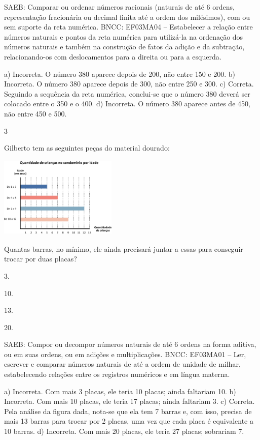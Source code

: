 \begin{multicols}{2}
\begin{enumerate}
{SAEB: Comparar ou ordenar números racionais (naturais de até 6 ordens, representação fracionária ou decimal finita até a ordem dos milésimos), com ou sem suporte da reta numérica.
BNCC: EF03MA04 -- Estabelecer a relação entre números naturais e pontos da reta numérica para
utilizá-la na ordenação dos números naturais e também na construção de fatos da adição e da
subtração, relacionando-os com deslocamentos para a direita ou para a esquerda.

a) Incorreta. O número 380 aparece depois de 200, não entre 150 e 200.
b) Incorreta. O número 380 aparece depois de 300, não entre 250 e 300.
c) Correta. Seguindo a sequência da reta numérica, conclui-se que o número 380 deverá ser colocado entre o 350 e o 400.
d) Incorreta. O número 380 aparece antes de 450, não entre 450 e 500.

\num{3}

Gilberto tem as seguintes peças do material dourado:


\includegraphics[width=2.20852in,height=1.52513in]{media/image118.png}

Quantas barras, no mínimo, ele ainda precisará juntar a essas para conseguir trocar por duas placas?

\begin{escolha}
\item
  3.
\item
  10.
\item
  13.
\item
  20.
\end{escolha}

SAEB: Compor ou decompor números naturais de até 6 ordens na forma aditiva, ou em suas ordens, ou em adições e multiplicações.
BNCC: EF03MA01 -- Ler, escrever e comparar números naturais de até a ordem de unidade de milhar, estabelecendo relações entre os registros numéricos e em língua materna.

a) Incorreta. Com mais 3 placas, ele teria 10 placas; ainda faltariam 10.
b) Incorreta. Com mais 10 placas, ele teria 17 placas; ainda faltariam 3.
c) Correta. Pela análise da figura dada, nota-se que ela tem 7 barras e, com isso,
precisa de mais 13 barras para trocar por 2 placas, uma vez que cada placa é equivalente a 10 barras.
d) Incorreta. Com mais 20 placas, ele teria 27 placas; sobrariam 7.

}
\end{enumerate}
\end{multicols}
